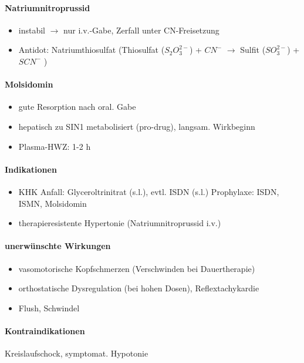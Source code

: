 \documentclass[10pt,a4paper]{report}
\begin{document}
\paragraph{Natriumnitroprussid}
\begin{itemize}
	\item instabil $\rightarrow$ nur i.v.-Gabe, Zerfall unter CN-Freisetzung
	\item Antidot: Natriumthiosulfat (Thiosulfat ($S_2O_3^{2-}$) + $CN^-$ $\rightarrow$ Sulfit ($SO_3^{2-}$) + $SCN^-$ )
\end{itemize}

\paragraph{Molsidomin}
\begin{itemize}
	\item gute Resorption nach oral. Gabe
	\item hepatisch zu SIN1 metabolisiert (pro-drug), langsam. Wirkbeginn
	\item Plasma-HWZ: 1-2 h
\end{itemize}

\paragraph{Indikationen}
\begin{itemize}
	\item KHK Anfall: Glyceroltrinitrat (s.l.), evtl. ISDN (s.l.) Prophylaxe: ISDN, ISMN, Molsidomin
	\item therapieresistente Hypertonie (Natriumnitroprussid i.v.)
\end{itemize}

\paragraph{unerwünschte Wirkungen}
\begin{itemize}
	\item vasomotorische Kopfschmerzen (Verschwinden bei Dauertherapie)
	\item orthostatische Dysregulation (bei hohen Dosen), Reflextachykardie
	\item Flush, Schwindel
\end{itemize}

\paragraph{Kontraindikationen} Kreislaufschock, symptomat. Hypotonie
\end{document}
